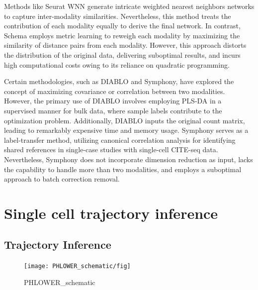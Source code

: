 Methods like Seurat WNN generate intricate weighted nearest neighbors networks to capture inter-modality similarities. Nevertheless, this method treats the contribution of each modality equally to derive the final network. In contrast, Schema employs metric learning to reweigh each modality by maximizing the similarity of distance pairs from each modality. However, this approach distorts the distribution of the original data, delivering suboptimal results, and incurs high computational costs owing to its reliance on quadratic programming.

Certain methodologies, such as DIABLO and Symphony, have explored the concept of maximizing covariance or correlation between two modalities. However, the primary use of DIABLO involves employing PLS-DA in a supervised manner for bulk data, where sample labels contribute to the optimization problem. Additionally, DIABLO inputs the original count matrix, leading to remarkably expensive time and memory usage. Symphony serves as a label-transfer method, utilizing canonical correlation analysis for identifying shared references in single-case studies with single-cell CITE-seq data. Nevertheless, Symphony does not incorporate dimension reduction as input, lacks the capability to handle more than two modalities, and employs a suboptimal approach to batch correction removal.

\section{Single cell trajectory inference}
\label{methods:TI}

\subsection{Trajectory Inference}




\begin{figure}[!ht]
	\centering
	\texttt{[image: PHLOWER\_schematic/fig]}
	\vspace{0.1cm}
	\caption[PHLOWER\_schematic.]{PHLOWER\_schematic}
	\label{fig:PHLOWER_schematic}
\end{figure}

